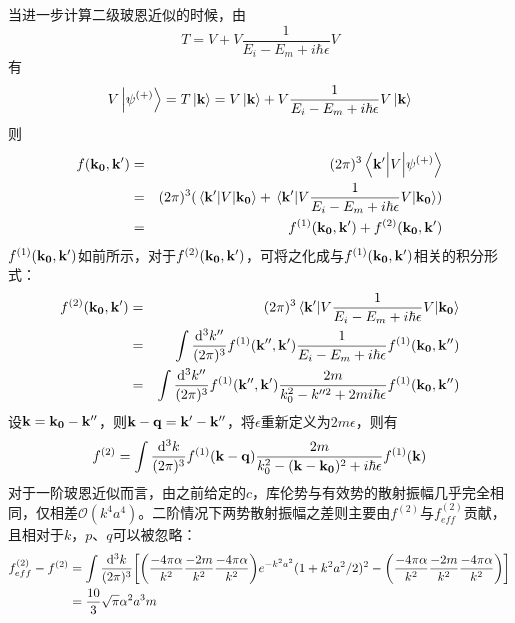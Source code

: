 \documentclass[cs4size,titlepage,twoside]{ctexart}
\begin{document}
当进一步计算二级玻恩近似的时候，由
\begin{equation}
	T=V+V\frac{1}{E_i-E_m+i\hbar\epsilon}V
\end{equation}
有
\begin{equation}
	V\ket{\psi^{(+)}}=T\ket{\vb{k}}=V\ket{\vb{k}}+V\frac{1}{E_i-E_m+i\hbar\epsilon}V\ket{\vb{k}}
\end{equation}
则
\begin{eqnarray*}
	f(\vb{k_0},\vb{k'}) &=& (2\pi)^3\mel{\vb{k'}}{V}{\psi^{(+)}}\\
	&=& (2\pi)^3(\mel{\vb{k'}}{V}{\vb{k_0}}+\mel{\vb{k'}}{V\frac{1}{E_i-E_m+i\hbar\epsilon}V}{\vb{k_0}}) \\
	&=& f^{(1)}(\vb{k_0},\vb{k'})+f^{(2)}(\vb{k_0},\vb{k'})
\end{eqnarray*}
$f^{(1)}(\vb{k_0},\vb{k'})$如前所示，对于$f^{(2)}(\vb{k_0},\vb{k'})$，可将之化成与$f^{(1)}(\vb{k_0},\vb{k'})$相关的积分形式：
\begin{eqnarray}
	f^{(2)}(\vb{k_0},\vb{k'})&=&(2\pi)^3\mel{\vb{k'}}{V\frac{1}{E_i-E_m+i\hbar\epsilon}V}{\vb{k_0}} \\
	&=&\int\frac{\dd^3k''}{(2\pi)^3}f^{(1)}(\vb{k''},\vb{k'})\frac{1}{E_i-E_m+i\hbar\epsilon}f^{(1)}(\vb{k_0},\vb{k''})\\
	&=&\int\frac{\dd^3k''}{(2\pi)^3}f^{(1)}(\vb{k''},\vb{k'})\frac{2m}{k_0^2-k''^2+2mi\hbar\epsilon}f^{(1)}(\vb{k_0},\vb{k''})
\end{eqnarray}
设$\vb{k}=\vb{k_0}-\vb{k''}$，则$\vb{k}-\vb{q}=\vb{k'}-\vb{k''}$，将$\epsilon$重新定义为$2m\epsilon$，则有
\begin{equation}
	f^{(2)}=\int\frac{\dd^3k}{(2\pi)^3}f^{(1)}(\vb{k}-\vb{q})\frac{2m}{k_0^2-(\vb{k}-\vb{k_0})^2+i\hbar\epsilon}f^{(1)}(\vb{k})
\end{equation}
对于一阶玻恩近似而言，由之前给定的$c$，库伦势与有效势的散射振幅几乎完全相同，仅相差$\mathcal{O}(k^4a^4)$。二阶情况下两势散射振幅之差则主要由$f^{(2)}$与$f_{eff}^{(2)}$贡献，且相对于$k$，$p$、$q$可以被忽略：
\begin{align}
	\nonumber f_{eff}^{(2)}-f^{(2)} & = \int\frac{\dd^3k}{(2\pi)^3}\bqty{\pqty{\frac{-4\pi\alpha}{k^2}\frac{-2m}{k^2}\frac{-4\pi\alpha}{k^2}}e^{-k^2a^2}(1+k^2a^2/2)^2-\pqty{\frac{-4\pi\alpha}{k^2}\frac{-2m}{k^2}\frac{-4\pi\alpha}{k^2}}} \\
	                                & = \frac{10}{3} \sqrt{\pi } \alpha^2  a^3 m
\end{align}
\end{document}
